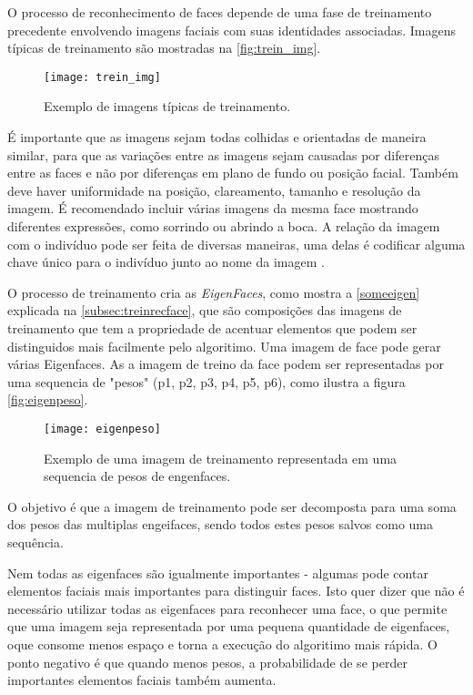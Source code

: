O processo de reconhecimento de faces depende de uma fase de treinamento precedente envolvendo imagens faciais com suas identidades associadas. Imagens típicas de treinamento são mostradas na \autoref{fig:trein_img}.
\begin{figure}[h]
	\centering
	\texttt{[image: trein\_img]}
	\caption{Exemplo de imagens típicas de treinamento.}
	\label{fig:trein_img}
\end{figure}

É importante que as imagens sejam todas colhidas e orientadas de maneira similar, para que as variações entre as imagens sejam causadas por diferenças entre as faces e não por diferenças  em plano de fundo ou posição facial. Também deve haver uniformidade na posição, clareamento, tamanho e resolução da imagem. É recomendado incluir várias imagens da mesma face mostrando diferentes expressões, como sorrindo ou abrindo a boca. A relação da imagem com o indivíduo pode ser feita de diversas maneiras, uma delas é codificar alguma chave único para o indivíduo junto ao nome da imagem \cite{drmathew_java_programming}. 



O processo de treinamento cria as \textit{EigenFaces}, como mostra a \autoref{someeigen} explicada na  \autoref{subsec:treinrecface}, que são composições das imagens de treinamento que tem a propriedade de acentuar elementos que podem ser distinguidos mais facilmente pelo algoritimo. Uma imagem de face pode gerar várias Eigenfaces. As a imagem de treino da face podem ser representadas por uma sequencia de "pesos" (p1, p2, p3, p4, p5, p6), como ilustra a figura \autoref{fig:eigenpeso}.
\begin{figure}[h]
	\centering
	\texttt{[image: eigenpeso]}
	\caption{Exemplo de uma imagem de treinamento representada em uma sequencia de pesos de engenfaces.}
	\label{fig:eigenpeso}
\end{figure}

O objetivo é que a imagem de treinamento pode ser decomposta para uma soma dos pesos das multiplas engeifaces, sendo todos estes pesos salvos como uma sequência.

Nem todas as eigenfaces são igualmente importantes - algumas pode contar elementos faciais mais importantes para distinguir faces. Isto quer dizer que não é necessário utilizar todas as eigenfaces para reconhecer uma face, o que permite que uma imagem seja representada por uma pequena quantidade de eigenfaces, oque consome menos espaço e torna a execução do algoritimo mais rápida. O ponto negativo é que quando menos pesos, a probabilidade de se perder importantes elementos faciais também aumenta\cite{drmathew_java_programming}.


